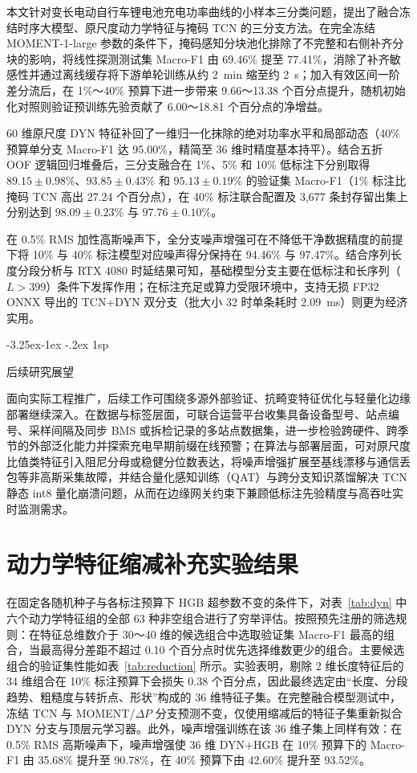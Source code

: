 \documentclass[12pt]{iopjournal}
\makeatletter
\renewcommand{\thetable}{\thesection-\arabic{table}}
\renewcommand\subsection{\@startsection{subsection}{2}{\z@}%
                   {-3.25ex\@plus -1ex \@minus -.2ex}%
                   {1sp}%
                   {\reset@font\normalsize\bfseries\raggedright}}
\makeatother
\begin{document}
本文针对变长电动自行车锂电池充电功率曲线的小样本三分类问题，提出了融合冻结时序大模型、原尺度动力学特征与掩码 TCN 的三分支方法。在完全冻结 MOMENT-1-large 参数的条件下，掩码感知分块池化排除了不完整和右侧补齐分块的影响，将线性探测测试集 Macro-F1 由 69.46\% 提至 77.41\%，消除了补齐敏感性并通过离线缓存将下游单轮训练从约 2~min 缩至约 2~s；加入有效区间一阶差分流后，在 1\%～40\% 预算下进一步带来 9.66～13.38 个百分点提升，随机初始化对照则验证预训练先验贡献了 6.00～18.81 个百分点的净增益。

60 维原尺度 DYN 特征补回了一维归一化抹除的绝对功率水平和局部动态（40\% 预算单分支 Macro-F1 达 95.00\%，精简至 36 维时精度基本持平）。结合五折 OOF 逻辑回归堆叠后，三分支融合在 1\%、5\% 和 10\% 低标注下分别取得 $89.15\pm0.98\%$、$93.85\pm0.43\%$ 和 $95.13\pm0.19\%$ 的验证集 Macro-F1（1\% 标注比掩码 TCN 高出 27.24 个百分点），在 40\% 标注联合配置及 3,677 条封存留出集上分别达到 $98.09\pm0.23\%$ 与 $97.76\pm0.10\%$。

在 0.5\% RMS 加性高斯噪声下，全分支噪声增强可在不降低干净数据精度的前提下将 10\% 与 40\% 标注模型对应噪声得分保持在 94.46\% 与 97.47\%。结合序列长度分段分析与 RTX 4080 时延结果可知，基础模型分支主要在低标注和长序列（$L>399$）条件下发挥作用；在标注充足或算力受限环境中，支持无损 FP32 ONNX 导出的 TCN+DYN 双分支（批大小 32 时单条耗时 2.09~ms）则更为经济实用。

\subsection{后续研究展望}

面向实际工程推广，后续工作可围绕多源外部验证、抗畸变特征优化与轻量化边缘部署继续深入。在数据与标签层面，可联合运营平台收集具备设备型号、站点编号、采样间隔及同步 BMS 或拆检记录的多站点数据集，进一步检验跨硬件、跨季节的外部泛化能力并探索充电早期前缀在线预警；在算法与部署层面，可对原尺度比值类特征引入阻尼分母或稳健分位数表达，将噪声增强扩展至基线漂移与通信丢包等非高斯采集故障，并结合量化感知训练（QAT）与跨分支知识蒸馏解决 TCN 静态 int8 量化崩溃问题，从而在边缘网关约束下兼顾低标注先验精度与高吞吐实时监测需求。

\appendix

\section{动力学特征缩减补充实验结果}\label{app:reduction}
\setcounter{table}{0}
\renewcommand{\thetable}{A-\arabic{table}}

在固定各随机种子与各标注预算下 HGB 超参数不变的条件下，对表~\ref{tab:dyn} 中六个动力学特征组的全部 63 种非空组合进行了穷举评估。按照预先注册的筛选规则：在特征总维数介于 30～40 维的候选组合中选取验证集 Macro-F1 最高的组合，当最高得分差距不超过 0.10 个百分点时优先选择维数更少的组合。主要候选组合的验证集性能如表~\ref{tab:reduction} 所示。实验表明，剔除 2 维长度特征后的 34 维组合在 10\% 标注预算下会损失 0.38 个百分点，因此最终选定由“长度、分段趋势、粗糙度与转折点、形状”构成的 36 维特征子集。在完整融合模型测试中，冻结 TCN 与 MOMENT/$\Delta P$ 分支预测不变，仅使用缩减后的特征子集重新拟合 DYN 分支与顶层元学习器。此外，噪声增强训练在该 36 维子集上同样有效：在 0.5\% RMS 高斯噪声下，噪声增强使 36 维 DYN+HGB 在 10\% 预算下的 Macro-F1 由 35.68\% 提升至 90.78\%，在 40\% 预算下由 42.60\% 提升至 93.52\%。
\end{document}
